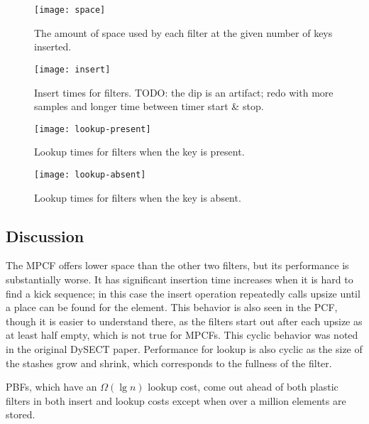 \documentclass[letterpaper, 11pt]{article}
\begin{document}

\begin{figure}
  \texttt{[image: space]}
  \caption{
    The amount of space used by each filter at the given number of keys inserted.
  }
\end{figure}


\begin{figure}
  \texttt{[image: insert]}
  \caption{
    Insert times for filters.
TODO: the dip is an artifact; redo with more samples and longer time between timer start \& stop.
  }
\end{figure}

\begin{figure}
  \texttt{[image: lookup-present]}
  \caption{
    Lookup times for filters when the key is present.
  }
\end{figure}

\begin{figure}
  \texttt{[image: lookup-absent]}
  \caption{
    Lookup times for filters when the key is absent.
  }
\end{figure}

\subsection{Discussion}

The MPCF offers lower space than the other two filters, but its performance is substantially worse.
It has significant insertion time increases when it is hard to find a kick sequence; in this case the insert operation repeatedly calls upsize until a place can be found for the element.
This behavior is also seen in the PCF, though it is easier to understand there, as the filters start out after each upsize as at least half empty, which is not true for MPCFs.
This cyclic behavior was noted in the original DySECT paper. \cite{dysect}
Performance for lookup is also cyclic as the size of the stashes grow and shrink, which corresponds to the fullness of the filter.

PBFs, which have an $\Omega(\lg n)$ lookup cost, come out ahead of both plastic filters in both insert and lookup costs except when over a million elements are stored.
\end{document}
